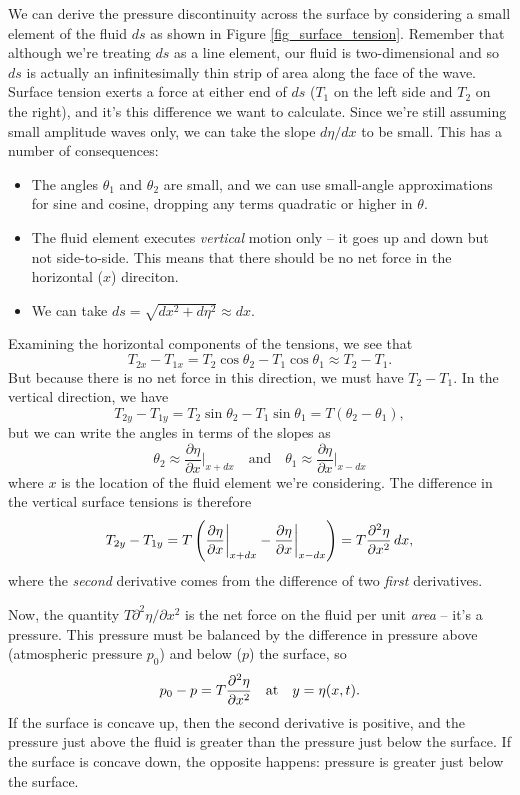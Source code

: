 We can derive the pressure discontinuity across the surface by considering a small element of the fluid $ds$ as shown in Figure \ref{fig_surface_tension}.  Remember that although we're treating $ds$ as a line element, our fluid is two-dimensional and so $ds$ is actually an infinitesimally thin strip of area along the face of the wave.  Surface tension exerts a force at either end of $ds$ ($T_1$ on the left side and  $T_2$ on the right), and it's this difference we want to calculate.  Since we're still assuming small amplitude waves only, we can take the slope $d\eta/dx$ to be small.  This has a number of consequences:
\begin{itemize}
\item The angles $\theta_1$ and $\theta_2$ are small, and we can use small-angle approximations for sine and cosine, dropping any terms quadratic or higher in $\theta$.
\item The fluid element executes \emph{vertical} motion only -- it goes up and down but not side-to-side.  This means that there should be no net force in the horizontal ($x$) direciton.
\item We can take $ds = \sqrt{dx^2 + d\eta^2} \approx dx$.
\end{itemize}

Examining the horizontal components of the tensions, we see that
\[
T_{2x} - T_{1x} = T_2 \cos\theta_2 - T_1 \cos \theta_1 \approx T_2 - T_1.
\]
But because there is no net force in this direction, we must have $T_2 - T_1$.  In the vertical direction, we have
\[
T_{2y} - T_{1y} = T_2 \sin\theta_2 - T_1 \sin \theta_1 = T ( \theta_2 - \theta_1),
\]
but we can write the angles in terms of the slopes as
\[
\theta_2 \approx \frac{\partial\eta}{\partial x}\bigg|_{x + dx} \quad \text{and} \quad \theta_1 \approx \frac{\partial\eta}{\partial x}\bigg|_{x - dx}
\]
where $x$ is the location of the fluid element we're considering.  The difference in the vertical surface tensions is therefore
\begin{equation}
T_{2y} - T_{1y} = T \left( \frac{\partial\eta}{\partial x}\bigg|_{x+dx} - \frac{\partial\eta}{\partial x} \bigg|_{x-dx} \right) = T \frac{\partial^2 {\eta}}{\partial {x}^2} \, dx,
\end{equation}
where the \emph{second} derivative comes from the difference of two \emph{first} derivatives.

Now, the quantity $T \partial^2\eta / \partial x^2$ is the net force on the fluid per unit \emph{area} -- it's a pressure.  This pressure must be balanced by the difference in pressure above (atmospheric pressure $p_0$) and below ($p$) the surface, so 
\begin{equation}
p_0 - p = T \frac{\partial^2 {\eta}}{\partial {x}^2} \quad \text{at} \quad y = \eta(x, t).
\end{equation}
If the surface is concave up, then the second derivative is positive, and the pressure just above the fluid is greater than the pressure just below the surface.  If the surface is concave down, the opposite happens:  pressure is greater just below the surface.

